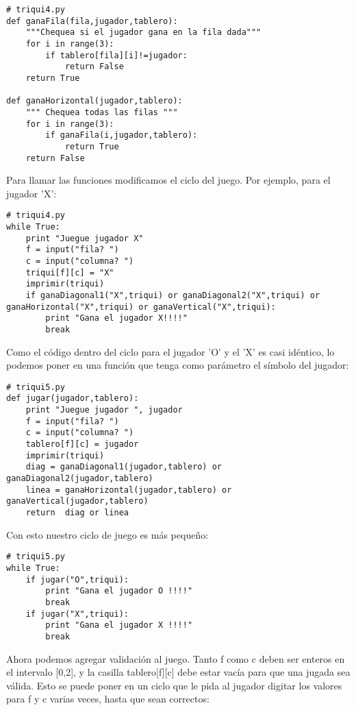 \beforeverb
\begin{verbatim}
# triqui4.py
def ganaFila(fila,jugador,tablero):
    """Chequea si el jugador gana en la fila dada"""
    for i in range(3):
        if tablero[fila][i]!=jugador:
            return False
    return True

def ganaHorizontal(jugador,tablero):
    """ Chequea todas las filas """
    for i in range(3):
        if ganaFila(i,jugador,tablero):
            return True
    return False
\end{verbatim}
\afterverb

Para llamar las funciones modificamos el ciclo del juego. Por ejemplo, para el jugador 'X':
\beforeverb
\begin{verbatim}
# triqui4.py
while True:
    print "Juegue jugador X"
    f = input("fila? ")
    c = input("columna? ")
    triqui[f][c] = "X"
    imprimir(triqui)
    if ganaDiagonal1("X",triqui) or ganaDiagonal2("X",triqui) or ganaHorizontal("X",triqui) or ganaVertical("X",triqui):
        print "Gana el jugador X!!!!"
        break
\end{verbatim}
\afterverb

Como el código dentro del ciclo para el jugador 'O' y el 'X' es casi idéntico, lo podemos poner en una
función que tenga como parámetro el símbolo del jugador:

\beforeverb
\begin{verbatim}
# triqui5.py
def jugar(jugador,tablero):
    print "Juegue jugador ", jugador
    f = input("fila? ")
    c = input("columna? ")
    tablero[f][c] = jugador
    imprimir(triqui)
    diag = ganaDiagonal1(jugador,tablero) or ganaDiagonal2(jugador,tablero)
    linea = ganaHorizontal(jugador,tablero) or ganaVertical(jugador,tablero)
    return  diag or linea
\end{verbatim}
\afterverb

Con esto nuestro ciclo de juego es más pequeño:

\beforeverb
\begin{verbatim}
# triqui5.py
while True:
    if jugar("O",triqui):
        print "Gana el jugador O !!!!"
        break
    if jugar("X",triqui):
        print "Gana el jugador X !!!!"
        break
\end{verbatim}
\afterverb


Ahora podemos agregar validación al juego. Tanto f como  c deben ser enteros
en el intervalo [0,2], y la casilla tablero[f][c] debe estar vacía para que
una jugada sea válida. Esto se puede poner en un ciclo que le pida al jugador
digitar los valores para f y c varias veces, hasta que sean correctos:

